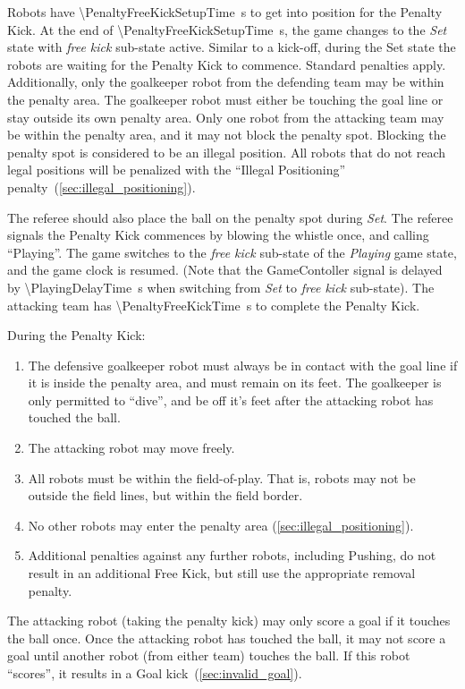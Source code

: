 Robots have \qty{\PenaltyFreeKickSetupTime}{\second} to get into position for the Penalty Kick. At the end of \qty{\PenaltyFreeKickSetupTime}{\second}, the game changes to the \textit{Set} state with \textit{free kick} sub-state active.
Similar to a kick-off, during the Set state the robots are waiting for the Penalty Kick to commence.
Standard penalties apply.
Additionally, only the goalkeeper robot from the defending team may be within the penalty area. The goalkeeper robot must either be touching the goal line or stay outside its own penalty area.
Only one robot from the attacking team may be within the penalty area, and it may not block the penalty spot.
Blocking the penalty spot is considered to be an illegal position.
All robots that do not reach legal positions will be penalized with the ``Illegal Positioning'' penalty~(\cf \cref{sec:illegal_positioning}).

The referee should also place the ball on the penalty spot during \textit{Set}.
The referee signals the Penalty Kick commences by blowing the whistle once, and calling ``Playing''.
The game switches to the \textit{free kick} sub-state of the \textit{Playing} game state, and the game clock is resumed.
(Note that the GameContoller signal is delayed by \qty{\PlayingDelayTime}{\second} when switching from \textit{Set} to \textit{free kick} sub-state).
The attacking team has \qty{\PenaltyFreeKickTime}{\second} to complete the Penalty Kick.

During the Penalty Kick:
\begin{enumerate}
    \item The defensive goalkeeper robot must always be in contact with the goal line if it is inside the penalty area, and must remain on its feet. The goalkeeper is only permitted to ``dive'', and be off it's feet after the attacking robot has touched the ball.
    \item The attacking robot may move freely.
    \item All robots must be within the field-of-play. That is, robots may not be outside the field lines, but within the field border.
    \item No other robots may enter the penalty area (\cf \cref{sec:illegal_positioning}).
    \item Additional penalties against any further robots, including Pushing, do not result in an additional Free
    Kick, but still use the appropriate removal penalty.
\end{enumerate}

The attacking robot (taking the penalty kick) may only score a goal if it touches the ball once.
Once the attacking robot has touched the ball, it may not score a goal until another robot (from either team) touches the ball.
If this robot ``scores'', it results in a Goal kick~(\cf \cref{sec:invalid_goal}).

